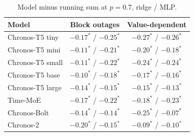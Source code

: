 \documentclass{article}
\begin{document}
\begin{table}[h]
  \caption{Model minus running sum at $p = 0.7$, ridge / MLP.}
  \label{tab:appc}
  \centering
  \small
  \begin{tabular}{lcc}
    \toprule
    Model & Block outages & Value-dependent \\
    \midrule
    Chronos-T5 tiny & $-0.17^{\ast}$ / $-0.25^{\ast}$ & $-0.27^{\ast}$ / $-0.26^{\ast}$ \\
    Chronos-T5 mini & $-0.11^{\ast}$ / $-0.21^{\ast}$ & $-0.20^{\ast}$ / $-0.18^{\ast}$ \\
    Chronos-T5 small & $-0.11^{\ast}$ / $-0.22^{\ast}$ & $-0.24^{\ast}$ / $-0.24^{\ast}$ \\
    Chronos-T5 base & $-0.10^{\ast}$ / $-0.18^{\ast}$ & $-0.17^{\ast}$ / $-0.16^{\ast}$ \\
    Chronos-T5 large & $-0.14^{\ast}$ / $-0.15^{\ast}$ & $-0.15^{\ast}$ / $-0.13^{\ast}$ \\
    Time-MoE & $-0.17^{\ast}$ / $-0.22^{\ast}$ & $-0.18^{\ast}$ / $-0.23^{\ast}$ \\
    Chronos-Bolt & $-0.14^{\ast}$ / $-0.14^{\ast}$ & $-0.25^{\ast}$ / $-0.07^{\ast}$ \\
    Chronos-2 & $-0.20^{\ast}$ / $-0.15^{\ast}$ & $-0.09^{\ast}$ / $-0.10^{\ast}$ \\
    \bottomrule
  \end{tabular}
\end{table}


\end{document}
